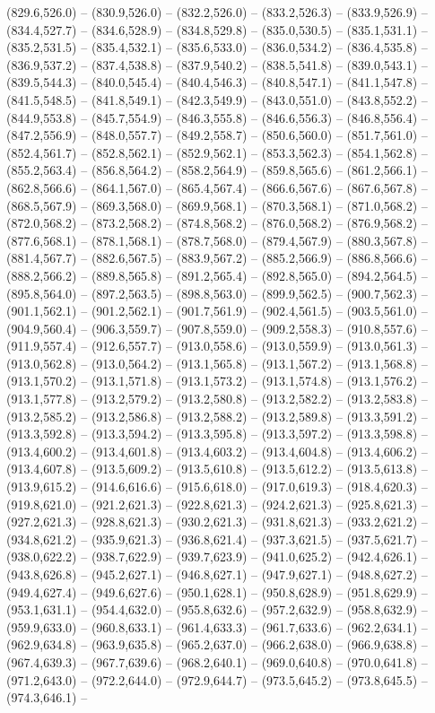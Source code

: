 (829.6,526.0) -- (830.9,526.0) -- (832.2,526.0) -- (833.2,526.3) -- (833.9,526.9) -- (834.4,527.7) -- (834.6,528.9) -- (834.8,529.8) -- (835.0,530.5) -- (835.1,531.1) -- (835.2,531.5) -- (835.4,532.1) -- (835.6,533.0) -- (836.0,534.2) -- (836.4,535.8) -- (836.9,537.2) -- (837.4,538.8) -- (837.9,540.2) -- (838.5,541.8) -- (839.0,543.1) -- (839.5,544.3) -- (840.0,545.4) -- (840.4,546.3) -- (840.8,547.1) -- (841.1,547.8) -- (841.5,548.5) -- (841.8,549.1) -- (842.3,549.9) -- (843.0,551.0) -- (843.8,552.2) -- (844.9,553.8) -- (845.7,554.9) -- (846.3,555.8) -- (846.6,556.3) -- (846.8,556.4) -- (847.2,556.9) -- (848.0,557.7) -- (849.2,558.7) -- (850.6,560.0) -- (851.7,561.0) -- (852.4,561.7) -- (852.8,562.1) -- (852.9,562.1) -- (853.3,562.3) -- (854.1,562.8) -- (855.2,563.4) -- (856.8,564.2) -- (858.2,564.9) -- (859.8,565.6) -- (861.2,566.1) -- (862.8,566.6) -- (864.1,567.0) -- (865.4,567.4) -- (866.6,567.6) -- (867.6,567.8) -- (868.5,567.9) -- (869.3,568.0) -- (869.9,568.1) -- (870.3,568.1) -- (871.0,568.2) -- (872.0,568.2) -- (873.2,568.2) -- (874.8,568.2) -- (876.0,568.2) -- (876.9,568.2) -- (877.6,568.1) -- (878.1,568.1) -- (878.7,568.0) -- (879.4,567.9) -- (880.3,567.8) -- (881.4,567.7) -- (882.6,567.5) -- (883.9,567.2) -- (885.2,566.9) -- (886.8,566.6) -- (888.2,566.2) -- (889.8,565.8) -- (891.2,565.4) -- (892.8,565.0) -- (894.2,564.5) -- (895.8,564.0) -- (897.2,563.5) -- (898.8,563.0) -- (899.9,562.5) -- (900.7,562.3) -- (901.1,562.1) -- (901.2,562.1) -- (901.7,561.9) -- (902.4,561.5) -- (903.5,561.0) -- (904.9,560.4) -- (906.3,559.7) -- (907.8,559.0) -- (909.2,558.3) -- (910.8,557.6) -- (911.9,557.4) -- (912.6,557.7) -- (913.0,558.6) -- (913.0,559.9) -- (913.0,561.3) -- (913.0,562.8) -- (913.0,564.2) -- (913.1,565.8) -- (913.1,567.2) -- (913.1,568.8) -- (913.1,570.2) -- (913.1,571.8) -- (913.1,573.2) -- (913.1,574.8) -- (913.1,576.2) -- (913.1,577.8) -- (913.2,579.2) -- (913.2,580.8) -- (913.2,582.2) -- (913.2,583.8) -- (913.2,585.2) -- (913.2,586.8) -- (913.2,588.2) -- (913.2,589.8) -- (913.3,591.2) -- (913.3,592.8) -- (913.3,594.2) -- (913.3,595.8) -- (913.3,597.2) -- (913.3,598.8) -- (913.4,600.2) -- (913.4,601.8) -- (913.4,603.2) -- (913.4,604.8) -- (913.4,606.2) -- (913.4,607.8) -- (913.5,609.2) -- (913.5,610.8) -- (913.5,612.2) -- (913.5,613.8) -- (913.9,615.2) -- (914.6,616.6) -- (915.6,618.0) -- (917.0,619.3) -- (918.4,620.3) -- (919.8,621.0) -- (921.2,621.3) -- (922.8,621.3) -- (924.2,621.3) -- (925.8,621.3) -- (927.2,621.3) -- (928.8,621.3) -- (930.2,621.3) -- (931.8,621.3) -- (933.2,621.2) -- (934.8,621.2) -- (935.9,621.3) -- (936.8,621.4) -- (937.3,621.5) -- (937.5,621.7) -- (938.0,622.2) -- (938.7,622.9) -- (939.7,623.9) -- (941.0,625.2) -- (942.4,626.1) -- (943.8,626.8) -- (945.2,627.1) -- (946.8,627.1) -- (947.9,627.1) -- (948.8,627.2) -- (949.4,627.4) -- (949.6,627.6) -- (950.1,628.1) -- (950.8,628.9) -- (951.8,629.9) -- (953.1,631.1) -- (954.4,632.0) -- (955.8,632.6) -- (957.2,632.9) -- (958.8,632.9) -- (959.9,633.0) -- (960.8,633.1) -- (961.4,633.3) -- (961.7,633.6) -- (962.2,634.1) -- (962.9,634.8) -- (963.9,635.8) -- (965.2,637.0) -- (966.2,638.0) -- (966.9,638.8) -- (967.4,639.3) -- (967.7,639.6) -- (968.2,640.1) -- (969.0,640.8) -- (970.0,641.8) -- (971.2,643.0) -- (972.2,644.0) -- (972.9,644.7) -- (973.5,645.2) -- (973.8,645.5) -- (974.3,646.1) -- 